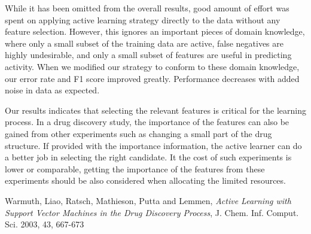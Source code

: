 \documentclass[paper=a4, fontsize=11pt]{scrartcl}
\numberwithin{equation}{section}    %
\numberwithin{figure}{section}      %
\numberwithin{table}{section}       %
\numberwithin{equation}{section}    %
\numberwithin{figure}{section}      %
\numberwithin{table}{section}       %
\begin{document}
While it has been omitted from the overall results, good amount of effort was spent on applying active learning strategy directly to the data without any feature selection. However, this ignores an important pieces of domain knowledge, where only a small subset of the training data are active, false negatives are highly undesirable, and only a small subset of features are useful in predicting activity. When we modified our strategy to conform to these domain knowledge, our error rate and F1 score improved greatly. Performance decreases with added noise in data as expected. 

Our results indicates that selecting the relevant features is critical for the learning process. In a drug discovery study, the importance of the features can also be gained from other experiments such as changing a small part of the drug structure. If provided with the importance information, the active learner can do a better job in selecting the right candidate. It the cost of such experiments is lower or comparable, getting the importance of the features from these experiments should be also considered when allocating the limited resources. 




\begin{thebibliography}{1}




Warmuth, Liao, Ratsch, Mathieson, Putta and Lemmen, \emph{Active Learning with Support Vector Machines in the Drug Discovery Process}, J. Chem. Inf. Comput. Sci. 2003, 43, 667-673

\end{thebibliography}
\end{document}
